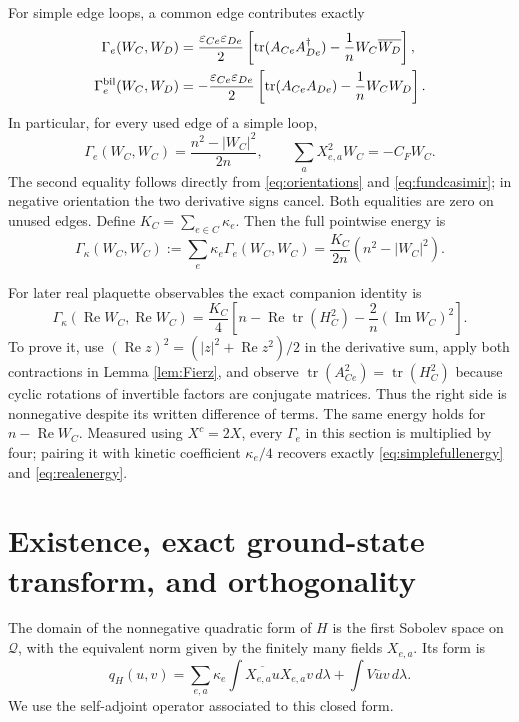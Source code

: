 \documentclass[11pt]{article}
\theoremstyle{definition}
\newcommand{\tr}{\operatorname{tr}}
\newcommand{\Rea}{\operatorname{Re}}
\newcommand{\Ima}{\operatorname{Im}}
\begin{document}
For simple edge loops, a common edge contributes exactly
\begin{align}
\Gamma_e(W_C,W_D)
 &=\frac{\varepsilon_{Ce}\varepsilon_{De}}2
   \left[\tr(A_{Ce}A_{De}^{\dagger})
                    -\frac1nW_C\overline{W_D}\right],\label{eq:overlap-simple}\\
\Gamma_e^{\rm bil}(W_C,W_D)
 &=-\frac{\varepsilon_{Ce}\varepsilon_{De}}2
   \left[\tr(A_{Ce}A_{De})-\frac1nW_CW_D\right].\nonumber
\end{align}
In particular, for every used edge of a simple loop,
\begin{equation}\label{eq:simpleenergy}
 \Gamma_e(W_C,W_C)=\frac{n^2-|W_C|^2}{2n},\qquad
 \sum_aX_{e,a}^2W_C=-C_FW_C.
\end{equation}
The second equality follows directly from \eqref{eq:orientations} and
\eqref{eq:fundcasimir}; in negative orientation the two derivative signs
cancel. Both equalities are zero on unused edges. Define
$K_C=\sum_{e\in C}\kappa_e$. Then the full pointwise energy is
\begin{equation}\label{eq:simplefullenergy}
 \Gamma_\kappa(W_C,W_C):=\sum_e\kappa_e\Gamma_e(W_C,W_C)
       =\frac{K_C}{2n}(n^2-|W_C|^2).
\end{equation}

For later real plaquette observables the exact companion identity is
\begin{equation}\label{eq:realenergy}
 \Gamma_\kappa(\Rea W_C,\Rea W_C)
 =\frac{K_C}{4}\left[n-\Rea\tr(H_C^2)
                           -\frac2n(\Ima W_C)^2\right].
\end{equation}
To prove it, use $(\Rea z)^2=(|z|^2+\Rea z^2)/2$ in the derivative
sum, apply both contractions in Lemma \ref{lem:Fierz}, and observe
$\tr(A_{Ce}^2)=\tr(H_C^2)$ because cyclic rotations of invertible factors
are conjugate matrices. Thus the right side is nonnegative despite its
written difference of terms. The same energy holds for $n-\Rea W_C$.
Measured using $X^c=2X$, every $\Gamma_e$ in this section is multiplied
by four; pairing it with kinetic coefficient $\kappa_e/4$ recovers
exactly \eqref{eq:simplefullenergy} and \eqref{eq:realenergy}.

\section{Existence, exact ground-state transform, and orthogonality}

The domain of the nonnegative quadratic form of $H$ is the first Sobolev
space on $\mathcal Q$, with the equivalent norm given by the finitely many
fields $X_{e,a}$. Its form is
\[
 q_H(u,v)=\sum_{e,a}\kappa_e\int\overline{X_{e,a}u}X_{e,a}v\,d\lambda
                   +\int V\overline uv\,d\lambda.
\]
We use the self-adjoint operator associated to this closed form.
\end{document}
